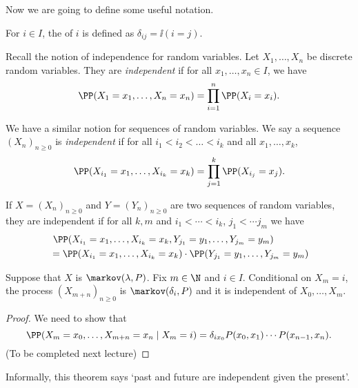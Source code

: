 \documentclass[a4paper]{scrartcl}
\begin{document}
Now we are going to define some useful notation.

\begin{definition}
	For $i \in I$, the  of $i$ is defined as
	$\delta_{ij} = \ii(i = j)$.
\end{definition}

Recall the notion of independence for random variables. Let $X_1, \dots, X_n$ be discrete random variables. They are \emph{independent} if for all $x_1, \dots, x_n \in I$, we have
$$
\PP(X_1= x_1, \dots, X_n = x_n) = \prod_{i = 1}^n \PP(X_i = x_i).
$$

We have a similar notion for sequences of random variables. We say a sequence $(X_n)_{n \geq 0}$ is \emph{independent} if for all $i_1 < i_2 < \dots < i_k$ and all $x_1, \dots, x_k$,
$$
\PP(X_{i_1} = x_1, \dots, X_{i_k} = x_k) = \prod_{j = 1}^k \PP(X_{i_j} = x_j).
$$

If $X = (X_n)_{n \geq 0}$ and $Y = (Y_n)_{n \geq 0}$ are two sequences of random variables, they are independent if for all $k, m$ and $i_1 < \cdots < i_k$, $j_1 < \cdots j_m$ we have
\begin{align*}
	&\ \PP(X_{i_1} = x_1, \dots, X_{i_k} = x_k, Y_{j_1} = y_1, \dots, Y_{j_m} = y_m) \\
	&= \PP(X_{i_1} = x_1, \dots, X_{i_k} = x_k) \cdot \PP(Y_{j_1} = y_1, \dots, Y_{j_m} = y_m) 
\end{align*}

\begin{theorem}
	Suppose that $X$ is $\markov(\lambda, P)$. Fix $m \in \N$ and $i \in I$. Conditional on $X_m = i$, the process $(X_{m + n})_{n \geq 0}$ is $\markov(\delta_i, P)$ and it is independent of $X_0, \dots, X_m$.
\end{theorem}

\begin{proof}
	We need to show that
	$$
	\PP(X_{m} = x_0, \dots, X_{m + n} = x_n \mid X_m = i) = \delta_{i x_0}P(x_0, x_1) \cdots P(x_{n - 1}, x_n).
	$$
	(To be completed next lecture)
\end{proof}

\begin{remark}
	Informally, this theorem says `past and future are independent given the present'.
\end{remark}
\end{document}

